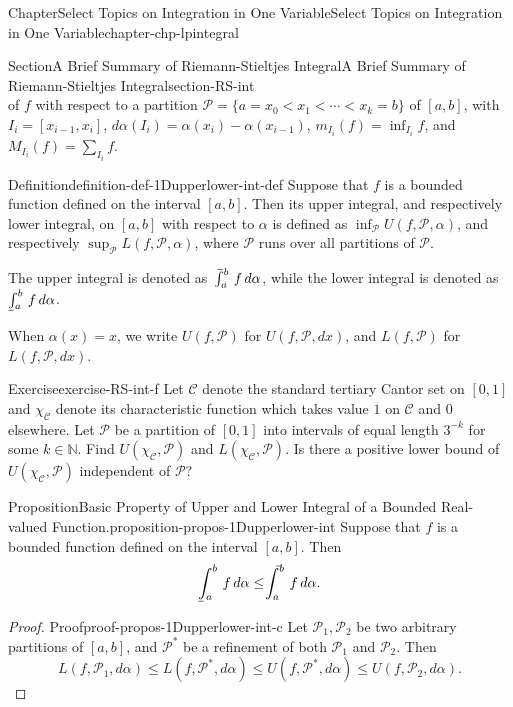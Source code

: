 \documentclass[oneside,10pt,]{book}
\makeatletter
\numberwithin{equation}{section}
\newcommand{\bbN}{\mathbb{N}}
\newcommand{\cC}{\mathcal{C}}
\newcommand{\cP}{\mathcal{P}}
\def\upint{\mathchoice
    {\mkern10mu\overline{\vphantom{\intop}\mkern7mu}\mkern-24mu}
    {\mkern7mu\overline{\vphantom{\intop}\mkern7mu}\mkern-14mu}
    {\mkern7mu\overline{\vphantom{\intop}\mkern7mu}\mkern-14mu}
    {\mkern7mu\overline{\vphantom{\intop}\mkern7mu}\mkern-14mu}
  \int}
\def\lowint{\relax\if@display
 \mkern3mu\underline{\vphantom{\intop}\mkern7mu}\mkern-10mu\int
\else 
\underline{\vphantom{\int}\mkern7mu}\mkern-10mu\int
\fi}
\makeatother
\begin{document}
\begin{chapterptx}{Chapter}{Select Topics on Integration in One Variable}{}{Select Topics on Integration in One Variable}{}{}{chapter-chp-lpintegral}
\begin{sectionptx}{Section}{A Brief Summary of Riemann-Stieltjes Integral}{}{A Brief Summary of Riemann-Stieltjes Integral}{}{}{section-RS-int}
\begin{equation*}
\end{equation*}
of \(f\) with respect to a partition \(\cP=\{a=x_{0} < x_{1} < \cdots < x_{k}=b\}\) of \([a, b]\), with \(I_{i}=[x_{i-1}, x_{i}]\), \(d\alpha (I_{i})=\alpha(x_{i})-\alpha(x_{i-1})\), \(m_{I_{i}} (f)=\inf_{I_{i}}f\), and \(M_{I_{i}} (f) =\sum_{I_{i}}f\).%
\begin{definition}{Definition}{}{definition-def-1Dupperlower-int-def}%
%
\label{notation-def-1Dupperlower-int-def-b}%
Suppose that \(f\) is a bounded function defined on the interval \([a, b]\). Then its upper integral, and respectively lower integral, on \([a, b]\)  with respect to \(\alpha\) is defined as \(\inf_{\cP}U(f, \cP, \alpha)\), and respectively \(\sup_{\cP}L(f, \cP, \alpha)\), where \(\cP\) runs over all partitions of \(\cP\).%
\par
The upper integral is denoted as \(\upint_{a}^{b}\,f\, d\alpha\), while the lower integral is denoted as \(\lowint_{a}^{b}\,f\, d\alpha\).%
\end{definition}
When \(\alpha(x)=x\), we write \(U(f, \cP)\) for \(U(f, \cP, dx)\), and \(L(f, \cP)\) for \(L(f, \cP, dx)\).%
\begin{inlineexercise}{Exercise}{}{exercise-RS-int-f}%
Let \(\cC\) denote the standard tertiary Cantor set on \([0, 1]\) and \(\chi_{\cC}\) denote its characteristic function which takes  value \(1\) on \(\cC\) and \(0\) elsewhere. Let \(\cP\) be a partition of \([0, 1]\) into intervals of equal length \(3^{-k}\) for some \(k\in \bbN\). Find \(U(\chi_{\cC}, \cP)\) and \(L(\chi_{\cC}, \cP)\). Is there a positive lower bound of \(U(\chi_{\cC}, \cP)\) independent of \(\cP\)?%
\end{inlineexercise}%
\begin{proposition}{Proposition}{Basic Property of Upper and Lower Integral of a Bounded Real-valued Function.}{}{proposition-propos-1Dupperlower-int}%
Suppose that \(f\) is a bounded function defined on the interval \([a, b]\). Then%
\begin{equation*}
\lowint_a^b\,f\, d\alpha \le  \upint_a^b\,f\, d\alpha.
\end{equation*}
\end{proposition}
\begin{proof}{Proof}{}{proof-propos-1Dupperlower-int-c}
Let \(\cP_{1}, \cP_{2}\) be two arbitrary partitions of \([a, b]\), and \(\cP^{*}\) be a refinement of both \(\cP_{1}\) and \(\cP_{2}\). Then%
\begin{equation*}
L(f, \cP_{1},d\alpha)\le L(f, \cP^{*}, d \alpha)\le U(f, \cP^{*}, d \alpha)\le U(f, \cP_{2}, d \alpha).

\end{equation*}
\end{proof}
\end{sectionptx}
\end{chapterptx}
\end{document}
